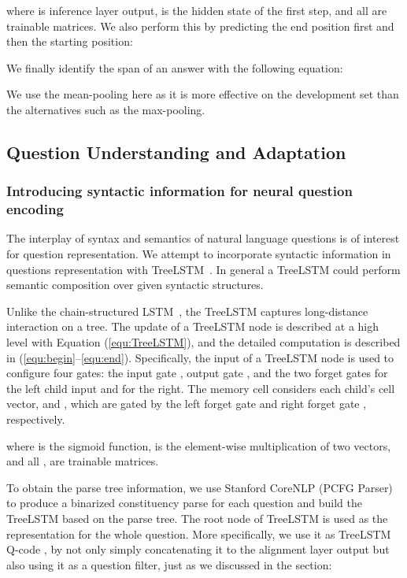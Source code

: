 \documentclass{article}
\begin{document}
where  is inference layer output,  is the hidden state of the first step, and all  are trainable matrices. We also perform this by predicting the end position first and then the starting position:


We finally identify the span of an answer with the following equation:


We use the mean-pooling here as it is more effective on the development set than the alternatives such as the max-pooling.

\subsection{Question Understanding and Adaptation}


\subsubsection{Introducing syntactic information for neural question encoding}

The interplay of syntax and semantics of natural language questions is of interest for question representation. We attempt to incorporate syntactic information in questions representation with TreeLSTM~\citep{zhu2015long,Tai2015}. In general a TreeLSTM could perform semantic composition over given syntactic structures. 

Unlike the chain-structured LSTM~\citep{hochreiter1997long}, the TreeLSTM captures long-distance interaction on a tree. The update of a TreeLSTM node is described at a high level with Equation (\ref{equ:TreeLSTM}), and the detailed computation is described in (\ref{equ:begin}--\ref{equ:end}). Specifically, the input of a TreeLSTM node is used to configure four gates: the input gate , output gate , and the two forget gates  for the left child input and  for the right. The memory cell  considers each child's cell vector,  and , which are gated by the left forget gate  and right forget gate , respectively. 

\vspace{-4mm}
{\fontsize{10pt}{1.0cm}
	
}\noindent where  is the sigmoid function,  is the element-wise multiplication of two vectors, and all ,  are trainable matrices.   


To obtain the parse tree information, we use Stanford CoreNLP (PCFG Parser)~\citep{Manning2014The,Klein2003Accurate} to produce a binarized constituency parse for each question and build the TreeLSTM based on the parse tree. The root node of TreeLSTM is used as the representation for the whole question. More specifically, we use it as TreeLSTM Q-code , by not only simply concatenating it to the alignment layer output but also using it as a question filter, just as we discussed in the \textit{} section:
\end{document}

